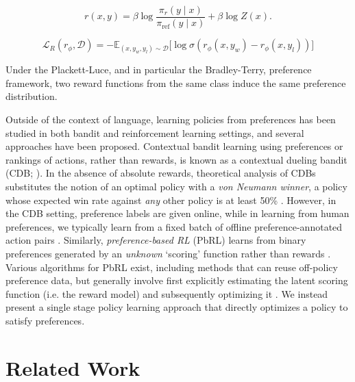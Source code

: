 \begin{equation}\label{eq:main_eq}
    r(x,y) =\beta \log \frac{\pi_r(y\mid x)}{\pi_\text{ref}(y\mid x)} + \beta \log Z(x).
\end{equation}

\begin{equation}\label{eq:reward_model}
    \mathcal{L}_R(r_{\phi}, \mathcal{D}) = -\mathbb{E}_{(x, y_w, y_l)\sim \mathcal{D}}\bigl[\log \sigma(r_{\phi}(x, y_w)- r_{\phi}(x, y_l))\bigr]
\end{equation}

\begin{lemma}\label{lemma:same_prefrence} Under the Plackett-Luce, and in particular the Bradley-Terry, preference framework, two reward functions from the same class induce the same preference distribution.
\end{lemma}

Outside of the context of language, learning policies from preferences has been studied in both bandit and reinforcement learning settings, and several approaches have been proposed. Contextual bandit learning using preferences or rankings of actions, rather than rewards, is known as a contextual dueling bandit (CDB; \cite{yue2012karmed,dudik2015contextual}). In the absence of absolute rewards, theoretical analysis of CDBs substitutes the notion of an optimal policy with a \textit{von Neumann winner}, a policy whose expected win rate against \textit{any} other policy is at least 50\% \citep{dudik2015contextual}. However, in the CDB setting, preference labels are given online, while in learning from human preferences, we typically learn from a fixed batch of offline preference-annotated action pairs \citep{yan2022human}. Similarly, \textit{preference-based RL} (PbRL) learns from binary preferences generated by an \textit{unknown} `scoring' function rather than rewards \citep{BusaFekete2014,ruiz2023dueling}. Various algorithms for PbRL exist, including methods that can reuse off-policy preference data, but generally involve first explicitly estimating the latent scoring function (i.e. the reward model) and subsequently optimizing it \citep{jain2013learning,BusaFekete2014,christiano2017deep,sadigh2017active,kupcsik2018learning}. We instead present a single stage policy learning approach that directly optimizes a policy to satisfy preferences.

\section{Related Work}

